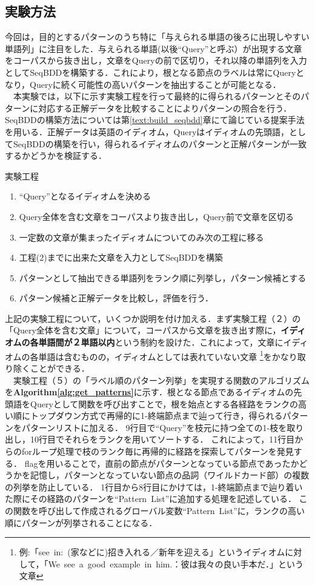 \documentclass[12pt,twoside, fleqn]{ujbook}
\begin{document}
	\subsection{実験方法}
	今回は，目的とするパターンのうち特に「与えられる単語の後ろに出現しやすい単語列」に注目をした．与えられる単語(以後``Query''と呼ぶ）が出現する文章をコーパスから抜き出し，文章をQueryの前で区切り，それ以降の単語列を入力としてSeqBDDを構築する．これにより，根となる節点のラベルは常にQueryとなり，Queryに続く可能性の高いパターンを抽出することが可能となる．\\
	　本実験では，以下に示す実験工程を行って最終的に得られるパターンとそのパターンに対応する正解データを比較することによりパターンの照合を行う．SeqBDDの構築方法については第\ref{text:build_seqbdd}章にて論じている提案手法を用いる．正解データは英語のイディオム，Queryはイディオムの先頭語，としてSeqBDDの構築を行い，得られるイディオムのパターンと正解パターンが一致するかどうかを検証する．

	\begin{itembox}[l]{実験工程}
	\label{jikken_tejun}
	\begin{enumerate}
		\item ``Query''となるイディオムを決める
		\item Query全体を含む文章をコーパスより抜き出し，Query前で文章を区切る
		\item 一定数の文章が集まったイディオムについてのみ次の工程に移る
		\item 工程(2)までに出来た文章を入力としてSeqBDDを構築
		\item パターンとして抽出できる単語列をランク順に列挙し，パターン候補とする
		\item パターン候補と正解データを比較し，評価を行う．
	\end{enumerate}
	\end{itembox}


	上記の実験工程について，いくつか説明を付け加える．まず実験工程（２）の「Query全体を含む文章」について，コーパスから文章を抜き出す際に，{\bf イディオムの各単語間が２単語以内}という制約を設けた．これによって，文章にイディオムの各単語は含むものの，イディオムとしては表れていない文章
	\footnote{例:「see\ in:\ (家などに)招き入れる／新年を迎える」というイディオムに対して，「We\ see\ a\ good\ example\ in\ him.：彼は我々の良い手本だ．」という文章}をかなり取り除くことができる．\\
	　実験工程（５）の「ラベル順のパターン列挙」を実現する関数のアルゴリズムを{\bf Algorithm\ref{alg:get_patterns}}に示す．根となる節点であるイディオムの先頭語をQueryとして関数を呼び出すことで，根を始点とする各経路をランクの高い順にトップダウン方式で再帰的に1-終端節点まで辿って行き，得られるパターンをパターンリストに加える．
	9行目で``Query''を枝元に持つ全ての1-枝を取り出し，10行目でそれらをランクを用いてソートする．
	これによって，11行目からのforループ処理で枝のランク毎に再帰的に経路を探索してパターンを発見する．
	flagを用いることで，直前の節点がパターンとなっている節点であったかどうかを記憶し，パターンとなっていない節点の品詞（ワイルドカード部）の複数の列挙を防止している．
	1行目から8行目にかけては，1-終端節点まで辿り着いた際にその経路のパターンを``Pattern\ List''に追加する処理を記述している．
	この関数を呼び出して作成されるグローバル変数``Pattern\ List''に，ランクの高い順にパターンが列挙されることになる．
\end{document}
